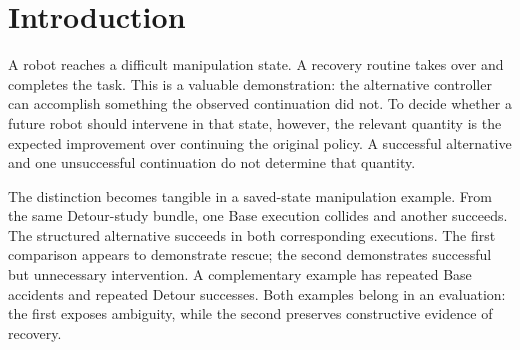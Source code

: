 \begin{abstract}

When a recovery branch succeeds, does it identify an intervention worth repeating? We study the gap between observed rescue and repeatable intervention value in vision-language-action policies using saved-state branching, same-policy pseudo-options, separate selection and evaluation blocks, and complete deadline readouts. We evaluate $\pi_0$ observation refresh and OpenVLA structured detour, then add 716 prospectively specified branch executions: 332 at existing states and 384 from twelve fresh physical reset sources. On existing sources, one-shot Refresh selection at 100 actions gains 12.50, 3.12 and zero percentage points across selection, estimation and prospective execution blocks. Its remaining full-repeat positive contribution reflects acceleration across the deadline. Full-repeat Detour selection at 440 actions instead retains 6.25, 4.17 and 5.21 points, including two persistently beneficial sources. On the unscreened fresh-reset population, the corresponding Detour gains are 1.39, zero and zero; no condition has a positive recorded success difference in the final block. Same-policy pseudo-options nevertheless produce apparent selection gains without introducing a recovery action. Separate-block estimation is informative but not uniformly more predictive. These results distinguish acceleration, repeated task rescue and limited skill-state support, directing attention to different research problems before training an intervention selector.


\end{abstract}

\section{Introduction}

A robot reaches a difficult manipulation state. A recovery routine takes over and completes the task. This is a valuable demonstration: the alternative controller can accomplish something the observed continuation did not. To decide whether a future robot should intervene in that state, however, the relevant quantity is the expected improvement over continuing the original policy. A successful alternative and one unsuccessful continuation do not determine that quantity.


The distinction becomes tangible in a saved-state manipulation example. From the same Detour-study bundle, one Base execution collides and another succeeds. The structured alternative succeeds in both corresponding executions. The first comparison appears to demonstrate rescue; the second demonstrates successful but unnecessary intervention. A complementary example has repeated Base accidents and repeated Detour successes. Both examples belong in an evaluation: the first exposes ambiguity, while the second preserves constructive evidence of recovery.


